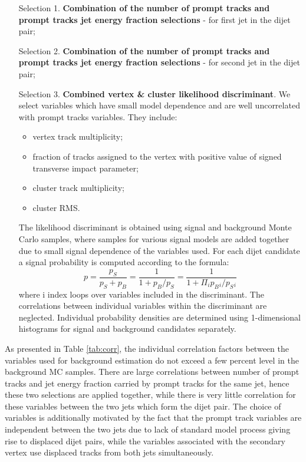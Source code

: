 \begin{itemize}     
\item[Selection 1.] {\bf Combination of the number of prompt tracks and prompt tracks jet energy fraction selections} - for first jet in the dijet pair;
\item[Selection 2.] {\bf Combination of the number of prompt tracks and prompt tracks jet energy fraction selections} - for second jet in the dijet pair;
\item[Selection 3.] {\bf Combined vertex \& cluster likelihood discriminant}. 
We select variables which have small model dependence and are 
well uncorrelated with prompt tracks variables. They include:
\begin{itemize}
 \item vertex track multiplicity;
 \item fraction of tracks assigned to the vertex with positive value of signed transverse impact parameter;
 \item cluster track multiplicity;
 \item cluster RMS.
\end{itemize}  
The likelihood discriminant is obtained using signal and background Monte Carlo samples, where samples for
various signal models are added together due to small signal dependence of the variables used.
For each dijet candidate a signal probability is computed according to the formula:
\begin{equation}
p=\frac{p_S}{p_S+p_B}=\frac{1}{1+p_B/p_S}=\frac{1}{1+\Pi_i p_B{}_i/p_S{}_i}
\label{eqn:likelihood}
\end{equation}
where i index loops over variables included in the discriminant. The correlations between individual variables 
within the discriminant are
neglected. Individual probability densities are determined 
using 1-dimensional histograms for signal and background candidates separately.
\end{itemize}

As presented in Table \ref{tab:corr}, the individual correlation factors between the variables used for background
estimation do not exceed a few percent level in the background MC samples.
There are large correlations between number of prompt tracks and jet energy fraction carried by prompt tracks 
for the same jet, hence these two selections are applied together, while there is very little correlation for these
variables between the two jets which form the dijet pair. The choice of variables is additionally motivated
 by the fact
that the prompt track variables are independent between the two jets due to lack of standard model 
process giving rise
to displaced dijet pairs, while the variables associated with the secondary vertex use displaced tracks
from both jets simultaneously.    

